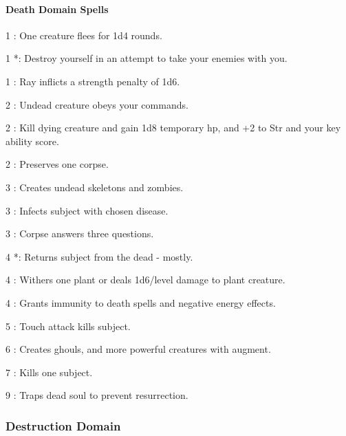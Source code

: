 \paragraph{Death Domain Spells}
\begin{list}{}{\leftmargin=1em}
\item[1] : One creature flees for 1d4 rounds.
\item[1] *: Destroy yourself in an attempt to take your enemies with you.
\item[1] : Ray inflicts a strength penalty of 1d6.
\item[2] : Undead creature obeys your commands.
\item[2] : Kill dying creature and gain 1d8 temporary hp, and +2 to Str and your key ability score.
\item[2] : Preserves one corpse.
\item[3] : Creates undead skeletons and zombies.
\item[3] : Infects subject with chosen disease.
\item[3] : Corpse answers three questions.
\item[4] *: Returns subject from the dead - mostly.
\item[4] : Withers one plant or deals 1d6/level damage to plant creature.
\item[4] : Grants immunity to death spells and negative energy effects.
\item[5] : Touch attack kills subject.
\item[6] : Creates ghouls, and more powerful creatures with augment.
\item[7] : Kills one subject.
\item[9] : Traps dead soul to prevent resurrection.
\end{list}
\subsubsection{Destruction Domain}
